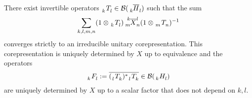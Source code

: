 \begin{Prop} \label{prop:corep-dual}
There exist invertible operators $\Grd{T}{k}{l} \in \mathcal{B}(\Grd{\overline{H}}{k}{l})$ such that the sum
\begin{align} \label{eq:dual}
   \sum_{k,l,m,n} (1\otimes \Grd{T}{k}{l}) \Gr{\overline{X}}{k}{l}{m}{n} (1 \otimes
  \Grd{T}{m}{n})^{-1}
\end{align}
converges strictly to an irreducible unitary corepresentation. This corepresentation is uniquely
determined by $X$ up to equivalence and the operators 
\begin{align*} 
  \Grd{F}{k}{l} := \overline{(\Grd{T}{l}{k})^{*}\Grd{T}{l}{k}} \in \mathcal{B}(\Grd{H}{k}{l})
\end{align*}
are uniquely determined by $X$ up to a scalar factor that does not depend on $k,l$.
\end{Prop}
